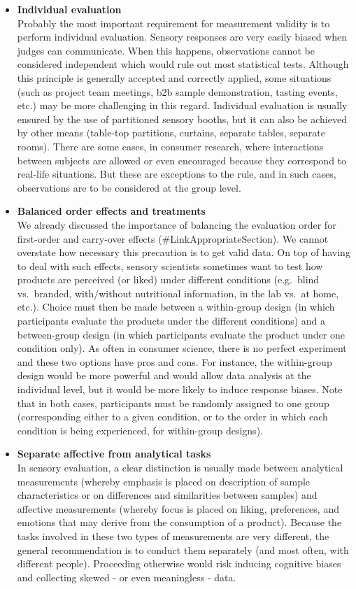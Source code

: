 \documentclass[
]{book}
\begin{document}
\begin{itemize}
\item
  \textbf{Individual evaluation}\\
  Probably the most important requirement for measurement validity is to perform individual evaluation. Sensory responses are very easily biased when judges can communicate. When this happens, observations cannot be considered independent which would rule out most statistical tests. Although this principle is generally accepted and correctly applied, some situations (such as project team meetings, b2b sample demonstration, tasting events, etc.) may be more challenging in this regard. Individual evaluation is usually ensured by the use of partitioned sensory booths, but it can also be achieved by other means (table-top partitions, curtains, separate tables, separate rooms). There are some cases, in consumer research, where interactions between subjects are allowed or even encouraged because they correspond to real-life situations. But these are exceptions to the rule, and in such cases, observations are to be considered at the group level.
\item
  \textbf{Balanced order effects and treatments}\\
  We already discussed the importance of balancing the evaluation order for first-order and carry-over effects (\#LinkAppropriateSection). We cannot overstate how necessary this precaution is to get valid data. On top of having to deal with such effects, sensory scientists sometimes want to test how products are perceived (or liked) under different conditions (e.g.~blind vs.~branded, with/without nutritional information, in the lab vs.~at home, etc.). Choice must then be made between a within-group design (in which participants evaluate the products under the different conditions) and a between-group design (in which participants evaluate the product under one condition only). As often in consumer science, there is no perfect experiment and these two options have pros and cons. For instance, the within-group design would be more powerful and would allow data analysis at the individual level, but it would be more likely to induce response biases. Note that in both cases, participants must be randomly assigned to one group (corresponding either to a given condition, or to the order in which each condition is being experienced, for within-group designs).
\item
  \textbf{Separate affective from analytical tasks}\\
  In sensory evaluation, a clear distinction is usually made between analytical measurements (whereby emphasis is placed on description of sample characteristics or on differences and similarities between samples) and affective measurements (whereby focus is placed on liking, preferences, and emotions that may derive from the consumption of a product). Because the tasks involved in these two types of measurements are very different, the general recommendation is to conduct them separately (and most often, with different people). Proceeding otherwise would risk inducing cognitive biases and collecting skewed - or even meaningless - data.

\end{itemize}
\end{document}
